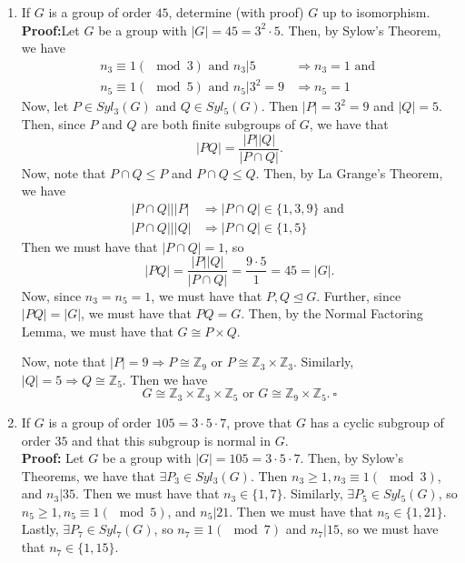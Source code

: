 \documentclass{article}
\begin{document}
\begin{enumerate}
    \item If $G$ is a group of order $45$, determine (with proof) $G$ up to isomorphism.\\
    \textbf{Proof:}Let $G$ be a group with $|G| = 45 = 3^2 \cdot 5$. Then, by Sylow's Theorem, we have
    \begin{align*}
        n_3 \equiv 1(\mod{3}) \text{ and } n_3 \big| 5 &\Longrightarrow n_3 = 1 \text{ and }\\
        n_5 \equiv 1(\mod{5}) \text{ and } n_5 \big| 3^2 = 9 &\Longrightarrow n_5 = 1
    \end{align*}
    Now, let $P \in Syl_3(G)$ and $Q \in Syl_5(G)$. Then $|P| = 3^2 = 9$ and $|Q|= 5$. Then, since $P$ and $Q$ are both finite subgroups 
    of $G$, we have that 
    \[
        |PQ| = \dfrac{|P||Q|}{|P \cap Q|}.
    \]
    Now, note that $P \cap Q \leq P$ and $P \cap Q \leq Q$. Then, by La Grange's Theorem, we have
    \begin{align*}
        |P \cap Q| \big| |P| &\Longrightarrow |P \cap Q| \in \{1,3,9\} \text{ and } \\
        |P \cap Q| \big| |Q| &\Longrightarrow |P \cap Q| \in \{1,5\}
    \end{align*}
    Then we must have that $|P \cap Q| = 1$, so 
    \[
        |PQ| = \dfrac{|P||Q|}{|P \cap Q|} = \dfrac{9 \cdot 5}{1} = 45 = |G|.
    \]
    Now, since $n_3 = n_5 = 1$, we must have that $P,Q \trianglelefteq G$. Further, since $|PQ|=|G|$, we must have that $PQ = G$. Then, by 
    the Normal Factoring Lemma, we must have that $G \cong P \times Q$.

    Now, note that $|P| = 9 \Longrightarrow P \cong \mathbb{Z}_9$ or $P \cong \mathbb{Z}_3 \times \mathbb{Z}_3$. Similarly, $|Q| = 5 
    \Longrightarrow Q \cong \mathbb{Z}_5$. Then we have 
    \[
        G \cong \mathbb{Z}_3 \times \mathbb{Z}_3 \times \mathbb{Z}_5 \text{ or } G \cong \mathbb{Z}_9 \times \mathbb{Z}_5. \ \square
    \]

    \item If $G$ is a group of order $105=3 \cdot 5 \cdot 7$, prove that $G$ has a cyclic subgroup of order $35$ and that this subgroup is 
    normal in $G$.\\
    \textbf{Proof:} Let $G$ be a group with $|G| = 105 = 3 \cdot 5 \cdot 7$. Then, by Sylow's Theorems, we have that $\exists P_3 \in 
    Syl_3(G)$. Then $n_3 \geq 1, n_3 \equiv 1(\mod{3})$, and $n_3 \big| 35$. Then we must have that $n_3 \in \{1,7\}$. Similarly, $\exists
    P_5 \in Syl_5(G)$, so $n_5 \geq 1, n_5 \equiv 1(\mod{5})$, and $n_5 \big| 21$. Then we must have that $n_5 \in \{1,21\}$. Lastly, 
    $\exists P_7 \in Syl_7(G)$, so $n_7 \equiv 1(\mod{7})$ and $n_7 \big| 15$, so we must have that $n_7 \in \{1,15\}$.


\end{enumerate}
\end{document}
